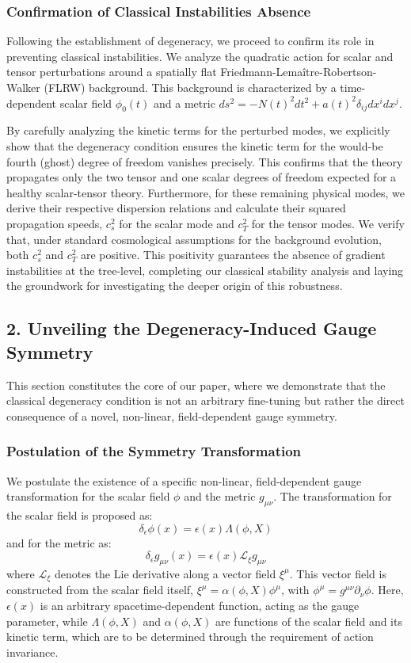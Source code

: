 \documentclass[twocolumn]{aastex631}
\begin{document}
\subsubsection*{Confirmation of Classical Instabilities Absence}
Following the establishment of degeneracy, we proceed to confirm its role in preventing classical instabilities. We analyze the quadratic action for scalar and tensor perturbations around a spatially flat Friedmann-Lemaître-Robertson-Walker (FLRW) background. This background is characterized by a time-dependent scalar field $\phi_0(t)$ and a metric $ds^2 = -N(t)^2 dt^2 + a(t)^2 \delta_{ij} dx^i dx^j$.

By carefully analyzing the kinetic terms for the perturbed modes, we explicitly show that the degeneracy condition ensures the kinetic term for the would-be fourth (ghost) degree of freedom vanishes precisely. This confirms that the theory propagates only the two tensor and one scalar degrees of freedom expected for a healthy scalar-tensor theory. Furthermore, for these remaining physical modes, we derive their respective dispersion relations and calculate their squared propagation speeds, $c_s^2$ for the scalar mode and $c_T^2$ for the tensor modes. We verify that, under standard cosmological assumptions for the background evolution, both $c_s^2$ and $c_T^2$ are positive. This positivity guarantees the absence of gradient instabilities at the tree-level, completing our classical stability analysis and laying the groundwork for investigating the deeper origin of this robustness.

\subsection*{2. Unveiling the Degeneracy-Induced Gauge Symmetry}
This section constitutes the core of our paper, where we demonstrate that the classical degeneracy condition is not an arbitrary fine-tuning but rather the direct consequence of a novel, non-linear, field-dependent gauge symmetry.

\subsubsection*{Postulation of the Symmetry Transformation}
We postulate the existence of a specific non-linear, field-dependent gauge transformation for the scalar field $\phi$ and the metric $g_{\mu\nu}$. The transformation for the scalar field is proposed as:
$$\delta_\epsilon \phi(x) = \epsilon(x) \Lambda(\phi, X)$$
and for the metric as:
$$\delta_\epsilon g_{\mu\nu}(x) = \epsilon(x) \mathcal{L}_{\xi} g_{\mu\nu}$$
where $\mathcal{L}_{\xi}$ denotes the Lie derivative along a vector field $\xi^\mu$. This vector field is constructed from the scalar field itself, $\xi^\mu = \alpha(\phi, X) \phi^\mu$, with $\phi^\mu = g^{\mu\nu}\partial_\nu\phi$. Here, $\epsilon(x)$ is an arbitrary spacetime-dependent function, acting as the gauge parameter, while $\Lambda(\phi, X)$ and $\alpha(\phi, X)$ are functions of the scalar field and its kinetic term, which are to be determined through the requirement of action invariance.
\end{document}
